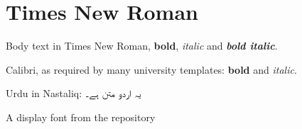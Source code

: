 \documentclass{article}
\begin{document}
\section{Times New Roman}
Body text in Times New Roman, \textbf{bold}, \textit{italic} and \textbf{\textit{bold italic}}.

{\sffamily Calibri, as required by many university templates: \textbf{bold} and \textit{italic}.}

Urdu in Nastaliq: \texturdu{یہ اردو متن ہے۔}

{\display\Large A display font from the repository}
\end{document}
